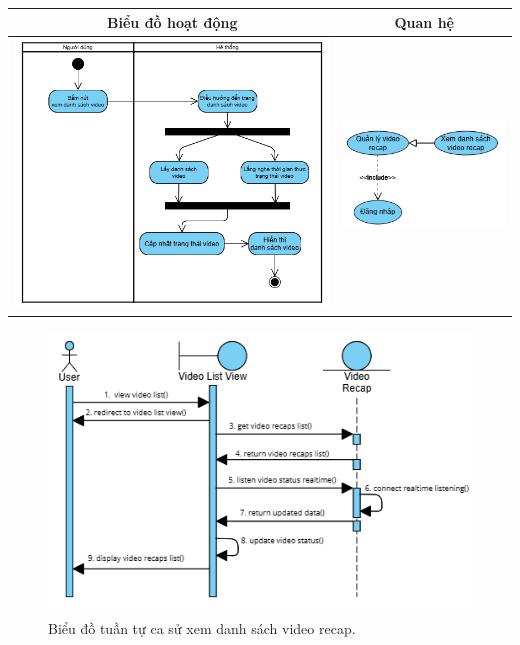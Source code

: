 \noindent 
\begin{tabular}{| c | c |}
    \hline
    \textbf{Biểu đồ hoạt động} & \textbf{Quan hệ} \\ 
    \hline
    \includegraphics[width=0.6\linewidth]{figures/c3/3-3-8-activity-diagram.png} 
    &  
    \includegraphics[width=0.35\linewidth]{figures/c3/3-3-8-relationship.png} \\ 
    \hline
\end{tabular}

\begin{figure}[H]
    \centering  
    \includegraphics[width=1\textwidth]{figures/c3/3-3-8-sequence-diagram.png}
    \caption{Biểu đồ tuần tự ca sử xem danh sách video recap.}
    \label{fig:3-3-8-sequence-diagram}
\end{figure}